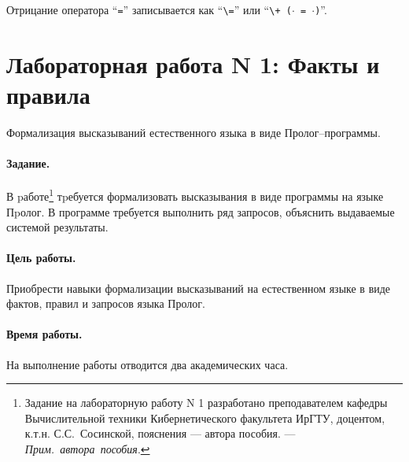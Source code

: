 \documentclass[12pt, openany, twoside]{book} %
\def\AR{{\em Прим.~автора~пособия}}
\begin{document}
Отрицание оператора ``{\tt =}'' записывается как ``{\tt \verb|\=|}'' или ``{\tt \verb|\+| ($\cdot$ = $\cdot$)}''.

\section{Лабораторная работа N 1: Факты и правила}

Формализация высказываний естественного языка в виде Про\-лог--прог\-рам\-мы.

\paragraph{Задание.} В pаботе\footnote{Задание на лабораторную работу N 1 разработано преподавателем кафедры Вычислительной техники Кибернетического факультета ИрГТУ, доцентом, к.т.н. С.С.~Сосинской, пояснения --- автора пособия. --- \AR.} тpебуется формализовать высказывания в виде программы на языке Пpолог. В программе требуется выполнить ряд запросов, объяснить выдаваемые системой результаты.

\paragraph{Цель работы.} Приобрести навыки формализации высказываний на естественном языке в виде фактов, правил и запросов языка Пролог.

\paragraph{Время работы.} На выполнение работы отводится два академических часа.
\end{document}
